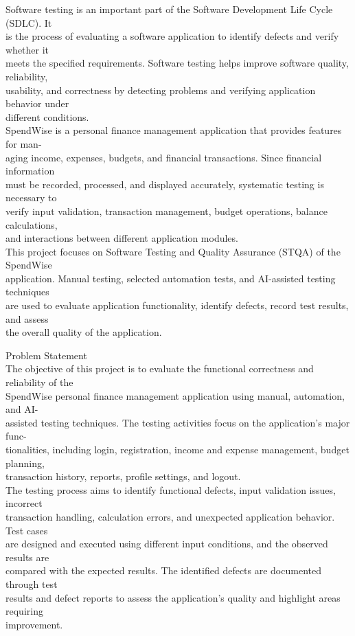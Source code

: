 \documentclass[12pt,a4paper]{report}
\begin{document}
\smallskip
Software testing is an important part of the Software Development Life Cycle (SDLC). It\\ 
is the process of evaluating a software application to identify defects and verify whether it\\ 
meets the specified requirements. Software testing helps improve software quality, reliability,\\ 
usability, and correctness by detecting problems and verifying application behavior under\\ 
different conditions.\\ 
SpendWise is a personal finance management application that provides features for man-\\ 
aging income, expenses, budgets, and financial transactions. Since financial information\\ 
must be recorded, processed, and displayed accurately, systematic testing is necessary to\\ 
verify input validation, transaction management, budget operations, balance calculations,\\ 
and interactions between different application modules.\\ 
This project focuses on Software Testing and Quality Assurance (STQA) of the SpendWise\\ 
application. Manual testing, selected automation tests, and AI-assisted testing techniques\\ 
are used to evaluate application functionality, identify defects, record test results, and assess\\ 
the overall quality of the application.\\ 

\smallskip

 Problem Statement\\ 

\smallskip
The objective of this project is to evaluate the functional correctness and reliability of the\\ 
SpendWise personal finance management application using manual, automation, and AI-\\ 
assisted testing techniques. The testing activities focus on the application’s major func-\\ 
tionalities, including login, registration, income and expense management, budget planning,\\ 
transaction history, reports, profile settings, and logout.\\ 
The testing process aims to identify functional defects, input validation issues, incorrect\\ 
transaction handling, calculation errors, and unexpected application behavior. Test cases\\ 
are designed and executed using different input conditions, and the observed results are\\ 
compared with the expected results. The identified defects are documented through test\\ 
results and defect reports to assess the application’s quality and highlight areas requiring\\ 
improvement.\\ 
\end{document}
